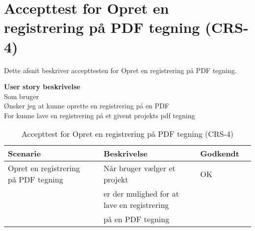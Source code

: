 \section{Accepttest for Opret en registrering på PDF tegning (CRS-4)}
Dette afsnit beskriver accepttesten for Opret en registrering på PDF tegning.

\textbf{User story beskrivelse} \\
Som bruger \\
Ønsker jeg at kunne oprette en registrering på en PDF \\
For kunne lave en registrering på et givent projekts pdf tegning

\begin{table}[H]
	\centering
	\begin{tabular}{|ll|l|ll|} \hline
		\textbf{Scenarie} &  & \textbf{Beskrivelse}&  \textbf{Godkendt}&  \\ \hline
		Opret en registrering på PDF tegning&  &  Når bruger vælger et projekt &  OK&  \\
		& & er der mulighed for at lave en registrering& & \\ 
			& & på en PDF tegning& & \\ \hline
	\end{tabular}
	\caption{Accepttest for Opret en registrering på PDF tegning (CRS-4)}
	\label{AcceptPDF}
\end{table}

\clearpage
